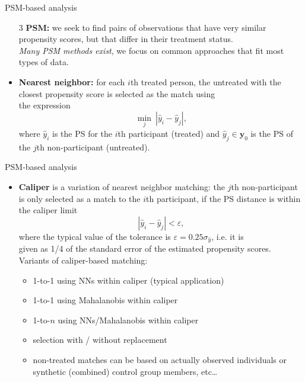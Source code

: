 \documentclass{beamer}
\begin{document}
\begin{frame}{PSM-based analysis}
\begin{enumerate}
    \item[3] \textbf{PSM:} we seek to find pairs of observations that have very similar propensity scores, but that differ in their treatment status. \\
    \smallskip
    \textit{Many PSM methods exist}, we focus on common approaches that fit most types of data.
\end{enumerate}
\begin{itemize}
    \item \textbf{Nearest neighbor:} for each $i$th treated person, the untreated with the closest propensity score is selected as the match using\\ the expression
    $$
    \underset{j}{\min}~|\hat{y}_i - \hat{y}_j|,
    $$
    where $\hat{y}_i$ is the PS for the $i$th participant (treated) and $\hat{y}_j \in \bm{y}_0$ is the PS of the $j$th non-participant (untreated). 
\end{itemize}
\end{frame}
\begin{frame}{PSM-based analysis}
\begin{itemize}
    \item \textbf{Caliper} is a variation of nearest neighbor matching: the $j$th non-participant is only selected as a match to the $i$th participant, if the PS distance is within the caliper limit 
    $$
    |\hat{y}_i - \hat{y}_j| < \varepsilon,
    $$
    where the typical value of the tolerance is $\varepsilon = 0.25 \sigma_{\hat{y}}$, i.e. it is \\given as 1/4 of the standard error of the estimated propensity scores.  \\ \medskip
    Variants of caliper-based matching: \\ \medskip
    \begin{itemize}
        \item 1-to-1 using NNs within caliper (typical application)
        \smallskip
        \item 1-to-1 using Mahalanobis within caliper
        \smallskip
        \item 1-to-$n$ using NNs/Mahalanobis within caliper
        \smallskip
        \item selection with / without replacement
        \item non-treated matches can be based on actually observed individuals or synthetic (combined) control group members, etc\dots
    \end{itemize}
\end{itemize}
\end{frame}
\end{document}

